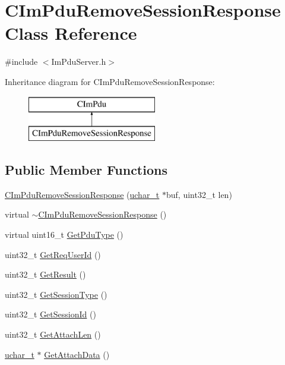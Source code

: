 \hypertarget{class_c_im_pdu_remove_session_response}{}\section{C\+Im\+Pdu\+Remove\+Session\+Response Class Reference}
\label{class_c_im_pdu_remove_session_response}


{\ttfamily \#include $<$Im\+Pdu\+Server.\+h$>$}

Inheritance diagram for C\+Im\+Pdu\+Remove\+Session\+Response\+:\begin{figure}[H]
\begin{center}
\leavevmode
\includegraphics[height=2.000000cm]{class_c_im_pdu_remove_session_response}
\end{center}
\end{figure}
\subsection*{Public Member Functions}
\begin{DoxyCompactItemize}
\item 
\hyperlink{class_c_im_pdu_remove_session_response_a754db006cbed36b68595744044231943}{C\+Im\+Pdu\+Remove\+Session\+Response} (\hyperlink{base_2ostype_8h_a124ea0f8f4a23a0a286b5582137f0b8d}{uchar\+\_\+t} $\ast$buf, uint32\+\_\+t len)
\item 
virtual \hyperlink{class_c_im_pdu_remove_session_response_a3f3bdabc2ca7a3d6bd2a87e9c6018b93}{$\sim$\+C\+Im\+Pdu\+Remove\+Session\+Response} ()
\item 
virtual uint16\+\_\+t \hyperlink{class_c_im_pdu_remove_session_response_a00f85253ea3e33779a331ee577a51f0c}{Get\+Pdu\+Type} ()
\item 
uint32\+\_\+t \hyperlink{class_c_im_pdu_remove_session_response_a699dca7ac54e3ab8415bcc6469dae64b}{Get\+Req\+User\+Id} ()
\item 
uint32\+\_\+t \hyperlink{class_c_im_pdu_remove_session_response_aa362faef335c604cfdba6b2bf9b20e3f}{Get\+Result} ()
\item 
uint32\+\_\+t \hyperlink{class_c_im_pdu_remove_session_response_a4f1c8e9caf462a5c786250750294256e}{Get\+Session\+Type} ()
\item 
uint32\+\_\+t \hyperlink{class_c_im_pdu_remove_session_response_a0aeae5fba90de69308761cdbc349a818}{Get\+Session\+Id} ()
\item 
uint32\+\_\+t \hyperlink{class_c_im_pdu_remove_session_response_a08a0fc68af42b465c147a625bffffaae}{Get\+Attach\+Len} ()
\item 
\hyperlink{base_2ostype_8h_a124ea0f8f4a23a0a286b5582137f0b8d}{uchar\+\_\+t} $\ast$ \hyperlink{class_c_im_pdu_remove_session_response_aee01e23b25307b71512262dc7be357a8}{Get\+Attach\+Data} ()
\end{DoxyCompactItemize}
